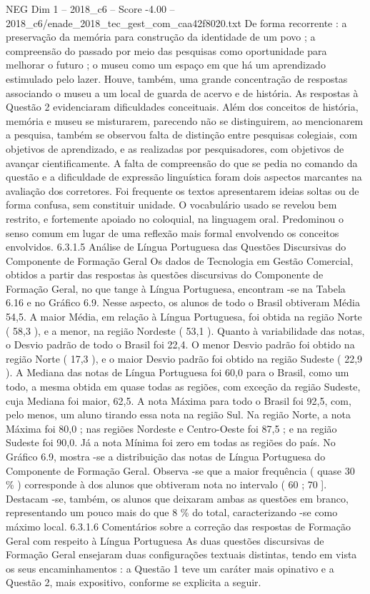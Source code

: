 \begin{textsample}{NEG Dim 1 – 2018\_c6 – Score -4.00 – 2018\_c6/enade\_2018\_tec\_gest\_com\_caa42f8020.txt}
De forma recorrente : a preservação da memória para construção da identidade de um povo ; a compreensão do passado por meio das pesquisas como oportunidade para melhorar o futuro ; o museu como um espaço em que há um aprendizado estimulado pelo lazer.
Houve, também, uma grande concentração de respostas associando o museu a um local de guarda de acervo e de história.
As respostas à Questão 2 evidenciaram dificuldades conceituais.
Além dos conceitos de história, memória e museu se misturarem, parecendo não se distinguirem, ao mencionarem a pesquisa, também se observou falta de distinção entre pesquisas colegiais, com objetivos de aprendizado, e as realizadas por pesquisadores, com objetivos de avançar cientificamente.
A falta de compreensão do que se pedia no comando da questão e a dificuldade de expressão linguística foram dois aspectos marcantes na avaliação dos corretores.
Foi frequente os textos apresentarem ideias soltas ou de forma confusa, sem constituir unidade.
O vocabulário usado se revelou bem restrito, e fortemente apoiado no coloquial, na linguagem oral.
Predominou o senso comum em lugar de uma reflexão mais formal envolvendo os conceitos envolvidos. 6.3.1.5 Análise de Língua Portuguesa das Questões Discursivas do Componente de Formação Geral Os dados de Tecnologia em Gestão Comercial, obtidos a partir das respostas às questões discursivas do Componente de Formação Geral, no que tange à Língua Portuguesa, encontram -se na Tabela 6.16 e no Gráfico 6.9.
Nesse aspecto, os alunos de todo o Brasil obtiveram Média 54,5.
A maior Média, em relação à Língua Portuguesa, foi obtida na região Norte ( 58,3 ), e a menor, na região Nordeste ( 53,1 ).
Quanto à variabilidade das notas, o Desvio padrão de todo o Brasil foi 22,4.
O menor Desvio padrão foi obtido na região Norte ( 17,3 ), e o maior Desvio padrão foi obtido na região Sudeste ( 22,9 ).
A Mediana das notas de Língua Portuguesa foi 60,0 para o Brasil, como um todo, a mesma obtida em quase todas as regiões, com exceção da região Sudeste, cuja Mediana foi maior, 62,5.
A nota Máxima para todo o Brasil foi 92,5, com, pelo menos, um aluno tirando essa nota na região Sul.
Na região Norte, a nota Máxima foi 80,0 ; nas regiões Nordeste e Centro-Oeste foi 87,5 ; e na região Sudeste foi 90,0.
Já a nota Mínima foi zero em todas as regiões do país.
No Gráfico 6.9, mostra -se a distribuição das notas de Língua Portuguesa do Componente de Formação Geral.
Observa -se que a maior frequência ( quase 30 \% ) corresponde à dos alunos que obtiveram nota no intervalo ( 60 ; 70 ].
Destacam -se, também, os alunos que deixaram ambas as questões em branco, representando um pouco mais do que 8 \% do total, caracterizando -se como máximo local. 6.3.1.6 Comentários sobre a correção das respostas de Formação Geral com respeito à Língua Portuguesa As duas questões discursivas de Formação Geral ensejaram duas configurações textuais distintas, tendo em vista os seus encaminhamentos : a Questão 1 teve um caráter mais opinativo e a Questão 2, mais expositivo, conforme se explicita a seguir.

\end{textsample}
